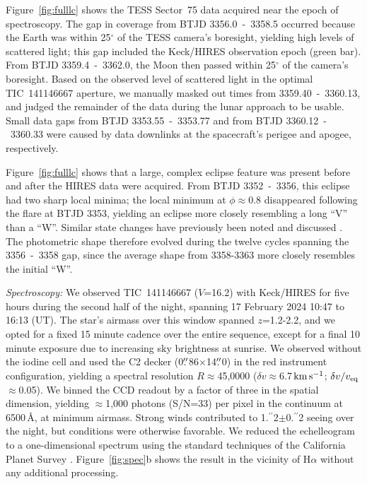 \documentclass{nature3}
\newcommand{\farcs}{\mbox{\ensuremath{.\!\!^{\prime\prime}}}}%
\newcommand{\kms}{\ensuremath{\rm km\,s^{-1}}}
\begin{document}
\begin{methods}
Figure~\ref{fig:fulllc} shows the TESS Sector~75 data acquired near
the epoch of spectroscopy.  The gap in coverage from BTJD
3356.0~-~3358.5 occurred because the Earth was within 25$^\circ$ of
the TESS camera's boresight, yielding high levels of scattered light;
this gap included the Keck/HIRES observation epoch (green bar).  From
BTJD 3359.4~-~3362.0, the Moon then passed within 25$^\circ$ of the
camera's boresight.  Based on the observed level of scattered light in
the optimal TIC~141146667 aperture, we manually masked out times from
3359.40~-~3360.13, and judged the remainder of the data during the
lunar approach to be usable.  Small data gaps from BTJD
3353.55~-~3353.77 and from BTJD 3360.12~-~3360.33 were caused by data
downlinks at the spacecraft's perigee and apogee, respectively.

Figure~\ref{fig:fulllc} shows that a large, complex eclipse
feature was present before and after the HIRES data were
acquired.  From BTJD 3352~-~3356, this eclipse had two sharp local
minima;  the local minimum at $\phi$$\approx$0.8 disappeared following
the flare at BTJD 3353, yielding an eclipse more closely resembling a
long ``V'' than a ``W''.  Similar state changes have previously been
noted and discussed \cite{Stauffer2017,Bouma2024}.  The photometric
shape therefore evolved during the twelve cycles spanning the
3356~-~3358 gap, since the average shape from 3358-3363 more
closely resembles the initial ``W''.



{\it Spectroscopy:}
We observed TIC~141146667 ($V$=16.2) with Keck/HIRES for five hours
during the second half of the night, spanning 17 February 2024 10:47
to 16:13 (UT).
The star's airmass over this window spanned $z$=1.2-2.2, and we opted
for a fixed 15 minute cadence over the entire sequence, except for a
final 10 minute exposure due to increasing sky brightness at sunrise.
We observed without the iodine cell and used the C2 decker
(0$\farcs$86$\times$14$\farcs$0) in the red instrument configuration,
yielding a spectral resolution $R$$\approx$45{,}0000 ($\delta
v$$\approx$6.7\,\kms; $\delta v / v_{\rm eq}$$\approx$0.05).  We binned
the CCD readout by a factor of three in the spatial dimension, yielding
$\approx$1,000 photons (S/N=33) per pixel in the continuum at 6500\,\AA,
at minimum airmass.  Strong winds contributed to 1\farcs2$\pm$0\farcs2
seeing over the night, but conditions were otherwise favorable.  We
reduced the echelleogram to a one-dimensional spectrum using the
standard techniques of the California Planet Survey \cite{Howard2010}.
Figure~\ref{fig:spec}b shows the result in the vicinity of H$\alpha$
without any additional processing.



\end{methods}
\end{document}
